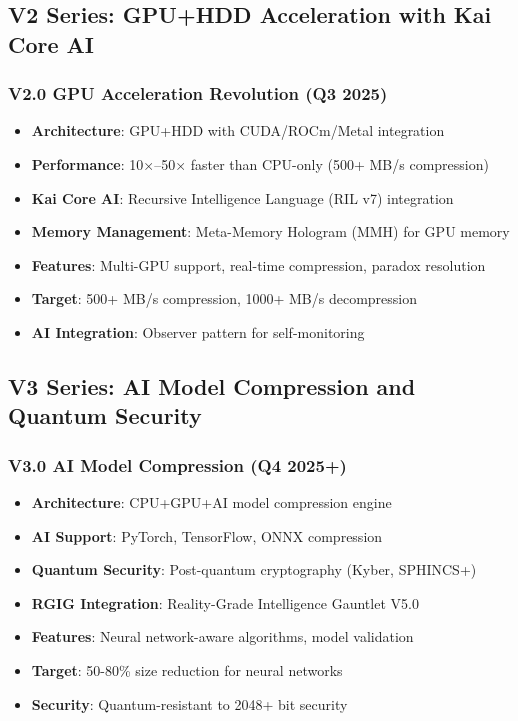 \documentclass[12pt,a4paper]{article}
\begin{document}
\subsection{V2 Series: GPU+HDD Acceleration with Kai Core AI}
\subsubsection{V2.0 GPU Acceleration Revolution (Q3 2025)}
\begin{itemize}
    \item \textbf{Architecture}: GPU+HDD with CUDA/ROCm/Metal integration
    \item \textbf{Performance}: 10×–50× faster than CPU-only (500+ MB/s compression)
    \item \textbf{Kai Core AI}: Recursive Intelligence Language (RIL v7) integration
    \item \textbf{Memory Management}: Meta-Memory Hologram (MMH) for GPU memory
    \item \textbf{Features}: Multi-GPU support, real-time compression, paradox resolution
    \item \textbf{Target}: 500+ MB/s compression, 1000+ MB/s decompression
    \item \textbf{AI Integration}: Observer pattern for self-monitoring
\end{itemize}

\subsection{V3 Series: AI Model Compression and Quantum Security}
\subsubsection{V3.0 AI Model Compression (Q4 2025+)}
\begin{itemize}
    \item \textbf{Architecture}: CPU+GPU+AI model compression engine
    \item \textbf{AI Support}: PyTorch, TensorFlow, ONNX compression
    \item \textbf{Quantum Security}: Post-quantum cryptography (Kyber, SPHINCS+)
    \item \textbf{RGIG Integration}: Reality-Grade Intelligence Gauntlet V5.0
    \item \textbf{Features}: Neural network-aware algorithms, model validation
    \item \textbf{Target}: 50-80\% size reduction for neural networks
    \item \textbf{Security}: Quantum-resistant to 2048+ bit security
\end{itemize}
\end{document}
